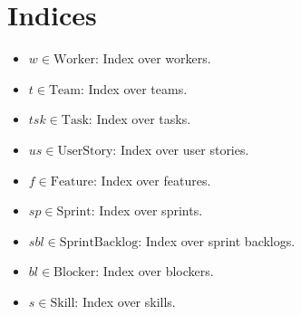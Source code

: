 \documentclass[11pt]{article}
\begin{document}
\section{Indices}
\begin{itemize}
    \item $w \in \text{Worker}$: Index over workers.
    \item $t \in \text{Team}$: Index over teams.
    \item $tsk \in \text{Task}$: Index over tasks.
    \item $us \in \text{UserStory}$: Index over user stories.
    \item $f \in \text{Feature}$: Index over features.
    \item $sp \in \text{Sprint}$: Index over sprints.
    \item $sbl \in \text{SprintBacklog}$: Index over sprint backlogs.
    \item $bl \in \text{Blocker}$: Index over blockers.
    \item $s \in \text{Skill}$: Index over skills.
\end{itemize}
\end{document}
